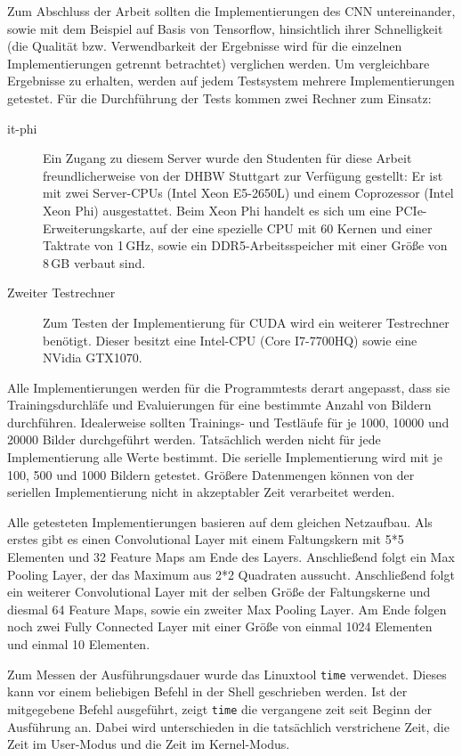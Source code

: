 \documentclass[../main.tex]{subfiles}
\begin{document}
Zum Abschluss der Arbeit sollten die Implementierungen des CNN untereinander, sowie mit dem Beispiel auf Basis von Tensorflow, hinsichtlich ihrer Schnelligkeit (die Qualität bzw. Verwendbarkeit der Ergebnisse wird für die einzelnen Implementierungen getrennt betrachtet) verglichen werden. Um vergleichbare Ergebnisse zu erhalten, werden auf jedem Testsystem mehrere Implementierungen getestet. Für die Durchführung der Tests kommen zwei Rechner zum Einsatz: 
\begin{description}
\item[it-phi] Ein Zugang zu diesem Server wurde den Studenten für diese Arbeit freundlicherweise von der DHBW Stuttgart zur Verfügung gestellt: Er ist mit zwei Server-CPUs (Intel Xeon E5-2650L) und einem Coprozessor (Intel Xeon Phi) ausgestattet. Beim Xeon Phi handelt es sich um eine PCIe-Erweiterungskarte, auf der eine spezielle CPU mit 60 Kernen und einer Taktrate von 1\,GHz, sowie ein DDR5-Arbeitsspeicher mit einer Größe von 8\,GB verbaut sind. 
\item[Zweiter Testrechner] Zum Testen der Implementierung für CUDA wird ein weiterer Testrechner benötigt. Dieser besitzt eine Intel-CPU (Core I7-7700HQ) sowie eine NVidia GTX1070. 
\end{description}
Alle Implementierungen werden für die Programmtests derart angepasst, dass sie Trainingsdurchläfe und Evaluierungen für eine bestimmte Anzahl von Bildern durchführen. Idealerweise sollten Trainings- und Testläufe für je 1000, 10000 und 20000 Bilder durchgeführt werden. Tatsächlich werden nicht für jede Implementierung alle Werte bestimmt. Die serielle Implementierung wird mit je 100, 500 und 1000 Bildern getestet. Größere Datenmengen können von der seriellen Implementierung nicht in akzeptabler Zeit verarbeitet werden. 

Alle getesteten Implementierungen basieren auf dem gleichen Netzaufbau. Als erstes gibt es einen Convolutional Layer mit einem Faltungskern mit 5*5 Elementen und 32 Feature Maps am Ende des Layers. Anschließend folgt ein Max Pooling Layer, der das Maximum aus 2*2 Quadraten aussucht. Anschließend folgt ein weiterer Convolutional Layer mit der selben Größe der Faltungskerne und diesmal 64 Feature Maps, sowie ein zweiter Max Pooling Layer. Am Ende folgen noch zwei Fully Connected Layer mit einer Größe von einmal 1024 Elementen und einmal 10 Elementen.

Zum Messen der Ausführungsdauer wurde das Linuxtool \texttt{time} verwendet. Dieses kann vor einem beliebigen Befehl in der Shell geschrieben werden. Ist der mitgegebene Befehl ausgeführt, zeigt \texttt{time} die vergangene zeit seit Beginn der Ausführung an. Dabei wird unterschieden in die tatsächlich verstrichene Zeit, die Zeit im User-Modus und die Zeit im Kernel-Modus.
\end{document}
